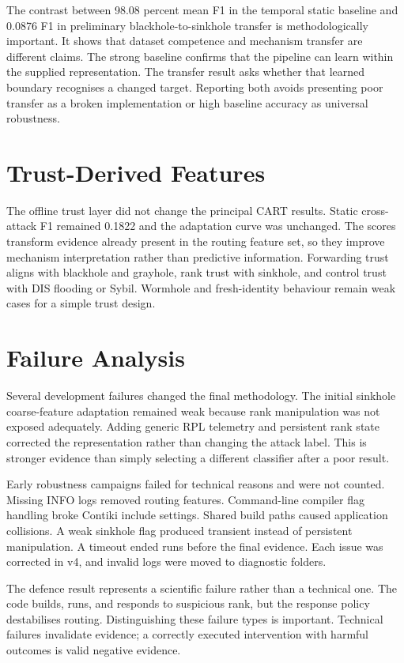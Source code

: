 The contrast between 98.08 percent mean F1 in the temporal static baseline and 0.0876 F1 in preliminary blackhole-to-sinkhole transfer is methodologically important. It shows that dataset competence and mechanism transfer are different claims. The strong baseline confirms that the pipeline can learn within the supplied representation. The transfer result asks whether that learned boundary recognises a changed target. Reporting both avoids presenting poor transfer as a broken implementation or high baseline accuracy as universal robustness.

\section{Trust-Derived Features}

The offline trust layer did not change the principal CART results. Static cross-attack F1 remained 0.1822 and the adaptation curve was unchanged. The scores transform evidence already present in the routing feature set, so they improve mechanism interpretation rather than predictive information. Forwarding trust aligns with blackhole and grayhole, rank trust with sinkhole, and control trust with DIS flooding or Sybil. Wormhole and fresh-identity behaviour remain weak cases for a simple trust design.

\section{Failure Analysis}

Several development failures changed the final methodology. The initial sinkhole coarse-feature adaptation remained weak because rank manipulation was not exposed adequately. Adding generic RPL telemetry and persistent rank state corrected the representation rather than changing the attack label. This is stronger evidence than simply selecting a different classifier after a poor result.

Early robustness campaigns failed for technical reasons and were not counted. Missing INFO logs removed routing features. Command-line compiler flag handling broke Contiki include settings. Shared build paths caused application collisions. A weak sinkhole flag produced transient instead of persistent manipulation. A timeout ended runs before the final evidence. Each issue was corrected in v4, and invalid logs were moved to diagnostic folders.

The defence result represents a scientific failure rather than a technical one. The code builds, runs, and responds to suspicious rank, but the response policy destabilises routing. Distinguishing these failure types is important. Technical failures invalidate evidence; a correctly executed intervention with harmful outcomes is valid negative evidence.
